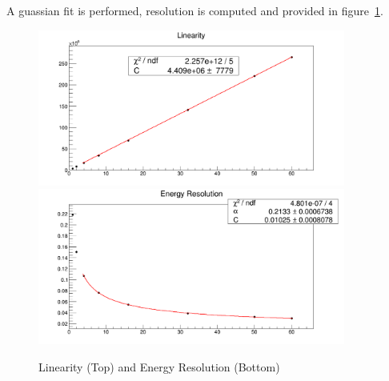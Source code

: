 A guassian fit is performed, resolution is computed and provided in figure~\ref{fig:simulations_hgc_pblinearityresolution}.
 \begin{figure}[hbp]
    \centering
    \includegraphics[width=0.9\textwidth]{figures/ch_simulations/hgc/performance/Pb/Linearity.png}
    \includegraphics[width=0.9\textwidth]{figures/ch_simulations/hgc/performance/Pb/Resolution.png}
    \caption{Linearity (Top) and Energy Resolution (Bottom)}
    \label{fig:simulations_hgc_pblinearityresolution}
 \end{figure}
